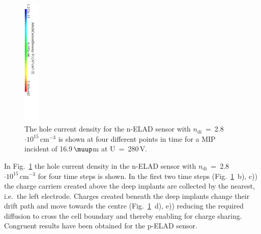 \documentclass[a4paper,11pt]{article}
\begin{document}
\begin{figure}[t!]
  \hfill 
  \includegraphics[trim= 0 30 0 0, height=6.1cm]{figures/legtr.pdf}
  \caption{
The hole current density for the n-ELAD sensor with $n\mathrm{_{di}}$~=~2.8$\mathrm{\cdot10^{15}\,cm^{-3}}$ is shown at four different points in time for a MIP incident of 16.9\,$\muup$m at U~=~280\,V.
}
  \label{fig:tr}
\end{figure}

In Fig.~\ref{fig:tr} the hole current density in the n-ELAD sensor with $n\mathrm{_{di}}$~=~2.8$\mathrm{\cdot10^{15}\,cm^{-3}}$ for four time steps is shown.
In the first two time steps (Fig.~\ref{fig:tr}~b), c)) the charge carriers created above the deep implants are collected by the nearest, i.e.\ the left electrode.
Charges created beneath the deep implants change their drift path and move towards the centre (Fig.~\ref{fig:tr}~d), e)) reducing the required diffusion to cross the cell boundary
 and thereby enabling for charge sharing.
Congruent results have been obtained for the p-ELAD sensor.
\end{document}
